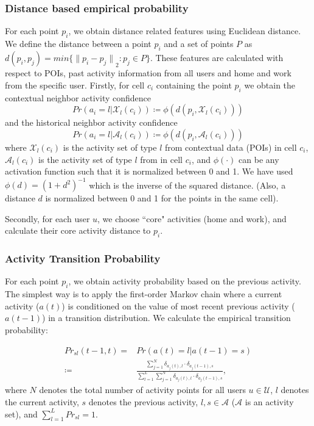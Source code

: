 \documentclass{sig-alternate}
\begin{document}
\subsubsection{Distance based empirical probability}
For each point $p_i$, we obtain distance related features using Euclidean distance. We define the distance between a point $p_i$ and a set of points $P$ as $d(p_i, p_j)=min\{{\|p_i - p_j\|}_2 : p_j \in P\}$. These features are calculated with respect to POIs, past activity information from all users and home and work from the specific user. Firstly, for cell $c_i$ containing the point $p_i$ we obtain the contextual neighbor activity confidence \begin{equation}\label{eq:prob3}
Pr(a_i=l|\mathcal{X}_l(c_i))  \coloneqq    \phi(d(p_i,\mathcal{X}_l(c_i)))
\end{equation}
and the historical neighbor activity confidence
\begin{equation}\label{eq:prob4}
Pr(a_i=l|\mathcal{A}_l(c_i))  \coloneqq    \phi(d(p_i,\mathcal{A}_l(c_i)))
\end{equation}
where $\mathcal{X}_l(c_i)$ is the activity set of type $l$ from contextual data (POIs) in cell $c_i$, $\mathcal{A}_l(c_i)$ is the activity set of type $l$ from  in cell $c_i$, and $\phi(\cdot)$ can be any activation function such that it is normalized between 0 and 1. We have used $\phi(d)={(1+d^2)}^{-1}$ which is the inverse of the squared distance. (Also, a distance $d$ is normalized between 0 and 1 for the points in the same cell).

Secondly, for  each user $u$, we choose ``core" activities (home and work), and calculate their core activity distance to $p_i$.


\subsubsection{Activity Transition Probability} For each point $p_i$, we obtain activity probability based on the previous activity. The simplest way is to apply the first-order Markov chain where a current activity ($a(t)$) is conditioned on the value of most recent previous activity ($a(t-1)$) in a transition distribution. We calculate the empirical transition probability:


\begin{eqnarray}\label{eq:transition}
Pr_{sl}(t-1,t) =  &  Pr(a(t) = l | a(t-1) = s)   \nonumber  \\
      \coloneqq   &   \frac{\sum_{j=1}^{N}\delta_{a_j(t), l}\cdot \delta_{a_j(t-1), s} } {\sum_{l=1}^L\sum_{j=1}^{N}\delta_{a_j(t), l}\cdot \delta_{a_j(t-1), s}} ,   \end{eqnarray}
where $N$ denotes the total number of activity points for all users $u \in \mathcal{U}$, $l$ denotes the current activity, $s$ denotes the previous activity, $l,s \in \mathcal{A}$ ($\mathcal{A}$ is an activity set), and  $\sum_{l=1}^L Pr_{sl} =1$.
\end{document}

